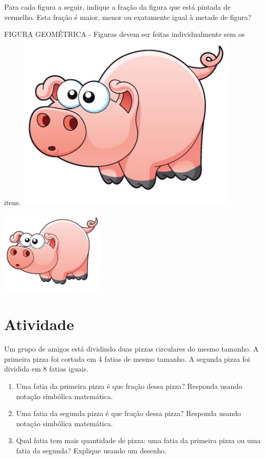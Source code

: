 \documentclass[a4,12pt]{book}
\begin{document}
Para cada figura a seguir, indique a fração da figura que está pintada de vermelho. Esta fração é maior, menor ou exatamente igual à metade de figura?
\begin{imagem*}[breakable]{}{}   FIGURA GEOMÉTRICA - Figuras devem ser feitas individualmente sem os itens.
    \includegraphics[width=300pt, keepaspectratio]{pig}
\end{imagem*}






\includegraphics[width=\textwidth,height=4cm, keepaspectratio]{pig}
\section{Atividade}







Um grupo de amigos está dividindo duas pizzas circulares do mesmo tamanho. A primeira pizza foi cortada em 4 fatias de mesmo tamanho. A segunda pizza foi dividida em 8 fatias iguais.

\begin{enumerate} [\quad a)] %
  \item     Uma fatia da primeira pizza é que fração dessa pizza? Responda usando notação simbólica matemática.
  \item     Uma fatia da segunda pizza é que fração dessa pizza? Responda usando notação simbólica matemática.
  \item     Qual fatia tem mais quantidade de pizza: uma fatia da primeira pizza ou uma fatia da segunda? Explique usando um desenho.
\end{enumerate} %
\end{document}

